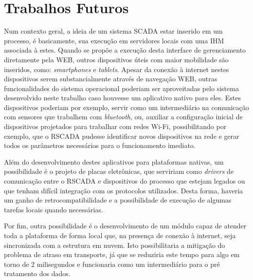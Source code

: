 \section{Trabalhos Futuros}
\label{sec:trabalhos-futuros}

Num contexto geral, a ideia de um sistema \gls{SCADA} estar inserido em um processo, é basicamente, sua execução em servidores locais com uma \gls{IHM} associada à estes. Quando se propõe a execução desta interface de gerenciamento diretamente pela \gls{WEB}, outros dispositivos úteis com maior mobilidade são inseridos, como: \textit{smartphones} e \textit{tablets}. Apesar da conexão à internet nestes dispositivos serem substancialmente através de navegação \gls{WEB}, outras funcionalidades do sistema operacional poderiam ser aproveitadas pelo sistema desenvolvido neste trabalho caso houvesse um aplicativo nativo para eles. Estes dispositivos poderiam por exemplo, servir como um intermediário na comunicação com sensores que trabalhem com \textit{bluetooth}, ou, auxiliar a configuração inicial de dispositivos projetados para trabalhar com redes Wi-Fi, possibilitando por exemplo, que o RSCADA pudesse identificar novos dispositivos na rede e gerar todos os parâmetros necessários para o funcionamento imediato.

Além do desenvolvimento destes aplicativos para plataformas nativas, um possibilidade é o projeto de placas eletrônicas, que serviriam como \textit{drivers} de comunicação entre o RSCADA e dispositivos do processo que estejam legados ou que tenham difícil integração com os protocolos utilizados. Desta forma, haveria um ganho de retrocompatibilidade e a possibilidade de execução de algumas tarefas locais quando necessárias.

Por fim, outra possibilidade é o desenvolvimento de um módulo capaz de atender toda a plataforma de forma local que, na presença de conexão à internet, seja sincronizada com a estrutura em nuvem. Isto possibilitaria a mitigação do problema de atraso em transporte, já que se reduziria este tempo para algo em torno de 2 milisegundos e funcionaria como um intermediário para o pré tratamento dos dados.